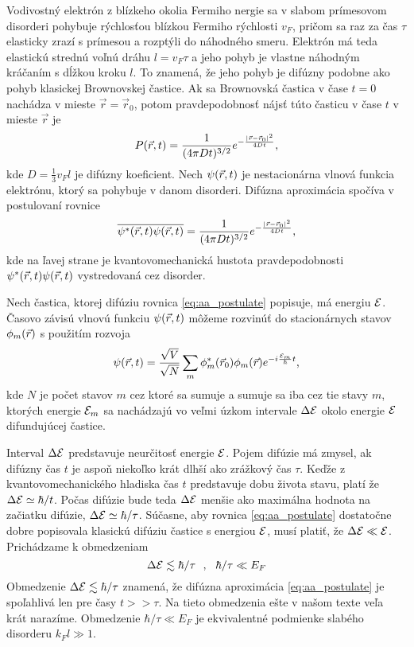  Vodivostný elektrón z blízkeho okolia Fermiho nergie sa v slabom prímesovom disorderi pohybuje rýchlosťou blízkou Fermiho rýchlosti $v_F$, pričom sa raz za čas $\tau$ elasticky zrazí s prímesou a rozptýli do náhodného smeru. Elektrón má teda elastickú strednú voľnú dráhu $l=v_F\tau$ a jeho pohyb je vlastne náhodným kráčaním s dĺžkou kroku $l$. To znamená, že jeho pohyb je difúzny podobne ako pohyb klasickej Brownovskej častice.
Ak sa Brownovská častica v čase $t=0$ nachádza v mieste $\vec r = \vec r_0$, potom pravdepodobnosť nájsť túto časticu v čase $t$  v mieste $\vec r$ je
\begin{equation}
 \label{eq:diffusion}
 P(\vec{r},t)=\frac{1}{(4\pi Dt)^{3/2}}e^{-\frac{|\vec{r}-\vec{r}_0|^2}{4Dt}} \text{,}
\end{equation}
kde $D =\frac{1}{3}v_Fl $ je difúzny koeficient.
Nech $\psi(\vec{r},t)$ je nestacionárna vlnová funkcia elektrónu, ktorý sa pohybuje v danom disorderi.
Difúzna aproximácia spočíva v postulovaní rovnice
\begin{equation}
 \label{eq:aa_postulate}
 \overline{\psi^*(\vec{r},t)\psi(\vec{r},t)}=\frac{1}{(4\pi Dt)^{3/2}}e^{-\frac{|\vec{r}-\vec{r}_0|^2}{4Dt}} \text{,}
\end{equation}
kde na ľavej strane je kvantovomechanická hustota pravdepodobnosti $\psi^*(\vec{r},t)\psi(\vec{r},t)$ vystredovaná cez disorder.

Nech častica, ktorej difúziu rovnica \eqref{eq:aa_postulate} popisuje, má energiu $\mathcal{E}$.
Časovo závisú vlnovú funkciu $\psi(\vec{r},t)$ môžeme rozvinúť do stacionárnych stavov $\phi_m(\vec{r})$ s použitím rozvoja
\begin{equation}
 \label{eq:aa_psi_sum}
 \psi(\vec{r},t)=\frac{\sqrt{V}}{\sqrt{N}}\sum_m \phi_m^*(\vec{r}_0)\phi_m(\vec{r})e^{-i\frac{\mathcal{E}_m}{\hbar}t} \text{,}
\end{equation}
kde $N$ je počet stavov $m$ cez ktoré sa sumuje a sumuje sa iba cez tie stavy $m$, ktorých energie $\mathcal{E}_m$ sa nachádzajú vo veľmi úzkom intervale $\Delta \mathcal{E}$ okolo energie $\mathcal{E}$ difundujúcej častice.

Interval $\Delta \mathcal{E}$ predstavuje neurčitosť energie $\mathcal{E}$. Pojem difúzie má zmysel, ak difúzny čas $t$ je aspoň niekoľko krát dlhší ako zrážkový čas $\tau$. Keďže z kvantovomechanického hladiska čas $t$ predstavuje
dobu života stavu, platí že $\Delta \mathcal{E} \simeq \hbar/t$. Počas difúzie bude teda $\Delta \mathcal{E}$ menšie ako maximálna hodnota na začiatku difúzie, $\Delta \mathcal{E} \simeq \hbar/\tau$. Súčasne, aby rovnica \eqref{eq:aa_postulate} dostatočne dobre popisovala
klasickú difúziu častice s energiou $\mathcal{E}$, musí platiť, že $\Delta \mathcal{E} \ll \mathcal{E} $. Prichádzame k obmedzeniam
\begin{equation}
 \label{eq:obmedzenia}
 \Delta \mathcal{E} \lesssim \hbar/\tau \ \ , \ \  \hbar/\tau \ll E_F
\end{equation}
Obmedzenie $\Delta \mathcal{E} \lesssim \hbar/\tau$ znamená, že difúzna aproximácia \eqref{eq:aa_postulate} je spoľahlivá len pre časy $t >> \tau$. Na tieto obmedzenia ešte v našom texte
veľa krát narazíme.  Obmedzenie $\hbar/\tau \ll E_F$ je ekvivalentné podmienke slabého disorderu $k_Fl \gg 1$.

